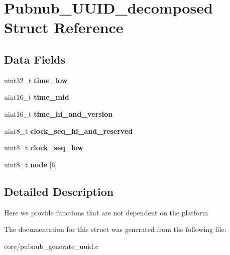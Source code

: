 \hypertarget{structPubnub__UUID__decomposed}{\section{Pubnub\-\_\-\-U\-U\-I\-D\-\_\-decomposed Struct Reference}
\label{structPubnub__UUID__decomposed}
}
\subsection*{Data Fields}
\begin{DoxyCompactItemize}
\item 
\hypertarget{structPubnub__UUID__decomposed_a56971c88d0980ddb24a4d2364455ff6b}{uint32\-\_\-t {\bfseries time\-\_\-low}}\label{structPubnub__UUID__decomposed_a56971c88d0980ddb24a4d2364455ff6b}

\item 
\hypertarget{structPubnub__UUID__decomposed_ae04a86a1c28df8288b807e5db77f8309}{uint16\-\_\-t {\bfseries time\-\_\-mid}}\label{structPubnub__UUID__decomposed_ae04a86a1c28df8288b807e5db77f8309}

\item 
\hypertarget{structPubnub__UUID__decomposed_a4ad34129c787b802200977b58930665c}{uint16\-\_\-t {\bfseries time\-\_\-hi\-\_\-and\-\_\-version}}\label{structPubnub__UUID__decomposed_a4ad34129c787b802200977b58930665c}

\item 
\hypertarget{structPubnub__UUID__decomposed_a3a30719fd70be5710d55f36971466e48}{uint8\-\_\-t {\bfseries clock\-\_\-seq\-\_\-hi\-\_\-and\-\_\-reserved}}\label{structPubnub__UUID__decomposed_a3a30719fd70be5710d55f36971466e48}

\item 
\hypertarget{structPubnub__UUID__decomposed_abdad6eb73ccba57444e451dbb15c72ee}{uint8\-\_\-t {\bfseries clock\-\_\-seq\-\_\-low}}\label{structPubnub__UUID__decomposed_abdad6eb73ccba57444e451dbb15c72ee}

\item 
\hypertarget{structPubnub__UUID__decomposed_a2b8c19bc6d59f441bfe5a7d492f5fb22}{uint8\-\_\-t {\bfseries node} \mbox{[}6\mbox{]}}\label{structPubnub__UUID__decomposed_a2b8c19bc6d59f441bfe5a7d492f5fb22}

\end{DoxyCompactItemize}


\subsection{Detailed Description}
Here we provide functions that are not dependent on the platform 

The documentation for this struct was generated from the following file\-:\begin{DoxyCompactItemize}
\item 
core/pubnub\-\_\-generate\-\_\-uuid.\-c\end{DoxyCompactItemize}
